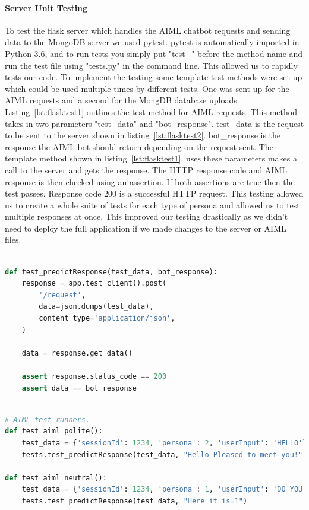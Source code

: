 \paragraph{Server Unit Testing}
To test the flask server which handles the AIML chatbot requests and sending data to the MongoDB server we used pytest. pytest is automatically imported in Python 3.6, and to run tests you simply put "test\_" before the method name and run the test file using "tests.py" in the command line. This allowed us to rapidly tests our code. To implement the testing some template test methods were set up which could be used multiple times by different tests. One was sent up for the AIML requests and a second for the MongDB database uploads. Listing~\ref{lst:flasktest1} outlines the test method for AIML requests. This method takes in two parameters "test\_data" and "bot\_response". test\_data is the request to be sent to the server shown in listing~\ref{lst:flasktest2}. bot\_response is the response the AIML bot should return depending on the request sent. The template method shown in listing~\ref{lst:flasktest1}, uses these parameters makes a call to the server and gets the response. The HTTP response code and AIML response is then checked using an assertion. If both assertions are true then the test passes. Response code 200 is a successful HTTP request. This testing allowed us to create a whole suite of tests for each type of persona and allowed us to test multiple responses at once. This improved our testing drastically as we didn't need to deploy the full application if we made changes to the server or AIML files.

\begin{lstlisting}[caption={pytest template method for testing AIML chatbot.},label={lst:flasktest1},language=python]

def test_predictResponse(test_data, bot_response):        
    response = app.test_client().post(
        '/request',
        data=json.dumps(test_data),
        content_type='application/json',
    )

    data = response.get_data()

    assert response.status_code == 200
    assert data == bot_response

\end{lstlisting}

\begin{lstlisting}[caption={pytest AIML runner methods which call template methods.},label={lst:flasktest2},language=python]

# AIML test runners.
def test_aiml_polite():
    test_data = {'sessionId': 1234, 'persona': 2, 'userInput': 'HELLO'}
    tests.test_predictResponse(test_data, "Hello Pleased to meet you!")

def test_aiml_neutral():
    test_data = {'sessionId': 1234, 'persona': 1, 'userInput': 'DO YOU HAVE A TICKET'}
    tests.test_predictResponse(test_data, "Here it is=1")

\end{lstlisting}

